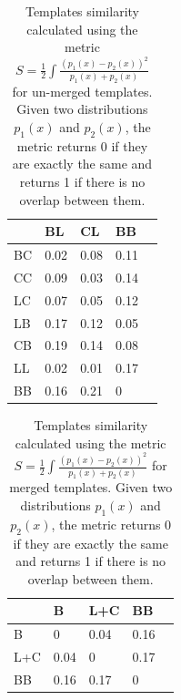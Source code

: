 \begin{table}[htpb]
\centering
\begin{tabular}{|l|l|l|l|l|}
\hline
   & BL   & CL    & BB   \\ \hline
BC & 0.02 & 0.08  & 0.11 \\ \hline
CC & 0.09 & 0.03  & 0.14 \\ \hline
LC & 0.07 & 0.05  & 0.12 \\ \hline
LB & 0.17 & 0.12  & 0.05 \\ \hline
CB & 0.19 & 0.14  & 0.08 \\ \hline
LL & 0.02 & 0.01  & 0.17 \\ \hline
BB & 0.16 & 0.21  & 0    \\ \hline

\end{tabular}
\caption{Templates similarity calculated using the metric $S=\frac{1}{2}\int \frac{(p_1(x)-p_2(x))^2}{p_1(x)+p_2(x)}$ for un-merged templates. Given two distributions $p_1(x)$ and $p_2(x)$, the metric returns 0 if they are exactly the same and returns 1 if there is no overlap between them.}
\label{tab:overlap-unmerged}
\end{table}



\begin{table}[htpb]
\centering
\begin{tabular}{|l|l|l|l|l|}
\hline
    & B    & L+C    & BB   \\ \hline
B   & 0    & 0.04  & 0.16 \\ \hline
L+C & 0.04 & 0     & 0.17 \\ \hline
BB  & 0.16 & 0.17  & 0    \\ \hline

\end{tabular}
\caption{Templates similarity calculated using the metric $S=\frac{1}{2}\int \frac{(p_1(x)-p_2(x))^2}{p_1(x)+p_2(x)}$ for merged templates. Given two distributions $p_1(x)$ and $p_2(x)$, the metric returns 0 if they are exactly the same and returns 1 if there is no overlap between them.}
\label{tab:overlap-merged}
\end{table}


